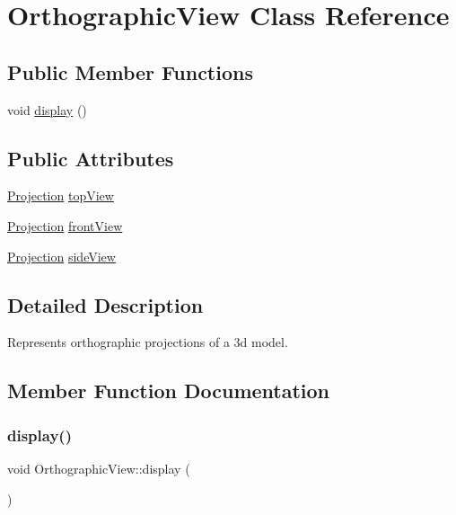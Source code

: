 \hypertarget{class_orthographic_view}{}\section{Orthographic\+View Class Reference}
\label{class_orthographic_view}
\subsection*{Public Member Functions}
\begin{DoxyCompactItemize}
\item 
void \hyperlink{class_orthographic_view_a84dbc8d87ce054d6d8e7d7751d8b265a}{display} ()
\end{DoxyCompactItemize}
\subsection*{Public Attributes}
\begin{DoxyCompactItemize}
\item 
\hyperlink{class_projection}{Projection} \hyperlink{class_orthographic_view_a0107ef76f715dd00984ce9b30e80d9bd}{top\+View}
\item 
\hyperlink{class_projection}{Projection} \hyperlink{class_orthographic_view_a6aef56f8180e166aba95c0de7f3715ec}{front\+View}
\item 
\hyperlink{class_projection}{Projection} \hyperlink{class_orthographic_view_a61767cc96527753531533d7ed581bab1}{side\+View}
\end{DoxyCompactItemize}


\subsection{Detailed Description}
Represents orthographic projections of a 3d model. 

\subsection{Member Function Documentation}
\mbox{\label{class_orthographic_view_a84dbc8d87ce054d6d8e7d7751d8b265a}} 
\subsubsection{\texorpdfstring{display()}{display()}}
{\footnotesize\ttfamily void Orthographic\+View\+::display (\begin{DoxyParamCaption}{ }\end{DoxyParamCaption})}

